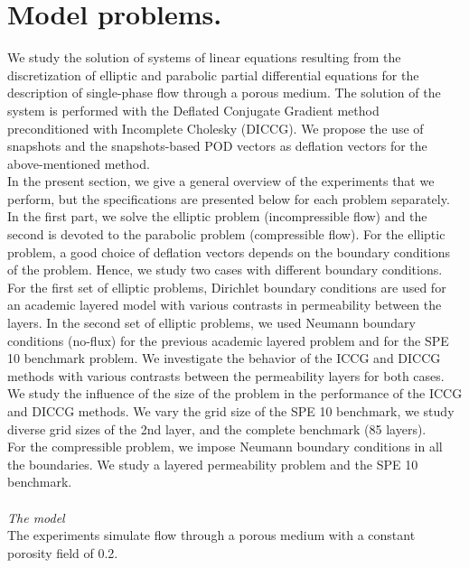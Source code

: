\documentclass[12pt]{article}
\begin{document}
\section{Model problems.}\label{modpro}
\hspace{0.5cm} We study the solution of systems of linear equations resulting from the discretization of elliptic and parabolic partial differential equations for the description of single-phase flow through a porous medium. 
The solution of the system is performed with the Deflated Conjugate Gradient method preconditioned with Incomplete Cholesky (DICCG).
We propose the use of snapshots and the snapshots-based POD vectors as deflation vectors for the above-mentioned method.\\
In the present section, we give a general overview of the experiments that we perform, but the specifications
 are presented below for each problem separately. In the first part, we solve the elliptic problem (incompressible flow) and the second is devoted to the parabolic problem (compressible flow).
 For the elliptic problem, a good choice of deflation vectors depends on the boundary 
conditions of the problem. Hence, we study two cases with different boundary conditions. 
For the first set of elliptic problems, Dirichlet boundary conditions are used for 
an academic layered model with various contrasts in permeability between the layers. 
In the second set of elliptic problems, we used Neumann boundary conditions (no-flux) for the previous academic
layered problem and for the SPE 10 benchmark problem. 
We investigate the behavior of the ICCG and DICCG methods with various contrasts between the 
permeability layers for both cases. \\
We study the influence of the size of the problem in the performance of the ICCG and DICCG methods. We vary the grid size of the SPE 10 benchmark, we study diverse grid sizes of the 2nd layer, and the complete benchmark (85 layers). \\
For the compressible problem, we impose Neumann boundary conditions in all the boundaries. We study a layered permeability problem and the SPE 10 benchmark.
\\ \\
\emph{The model}\\
The experiments simulate flow through a porous medium with a constant porosity field of 0.2.
\end{document}
